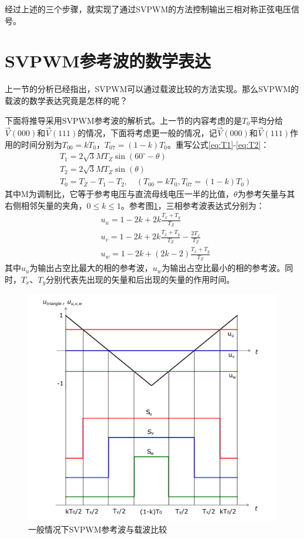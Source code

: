 \documentclass{ctexart}
\numberwithin{equation}{section}
\begin{document}
经过上述的三个步骤，就实现了通过SVPWM的方法控制输出三相对称正弦电压信号。

\section{SVPWM参考波的数学表达}
上一节的分析已经指出，SVPWM可以通过载波比较的方法实现。那么SVPWM的载波的数学表达究竟是怎样的呢？

下面将推导采用SVPWM参考波的解析式。上一节的内容考虑的是$T_0$平均分给$\vec V(000)$和$\vec V(111)$的情况，下面将考虑更一般的情况，记$\vec V(000)$和$\vec V(111)$作用的时间分别为$T_{00}=kT_0$，$T_{07}=(1-k)T_0$。重写公式\ref{eq:T1}-\ref{eq:T2}：
\begin{equation}
  \begin{aligned}
&T_{1}=2\sqrt{3} M T_{Z} \sin \left(60^{\circ}-\theta\right)\\
&T_{2}=2\sqrt{3} M T_{Z} \sin (\theta)\\
&T_0 = T_Z - T_1 -T_2,\quad (T_{00}=kT_0,T_{07}=(1-k)T_0)
\end{aligned}
\end{equation}
其中M为调制比，它等于参考电压与直流母线电压一半的比值，$ \theta $为参考矢量与其右侧相邻矢量的夹角，$ 0\leq k\leq 1 $。参考图\ref{fig:svpwm-wave0}，三相参考波表达式分别为：
\begin{equation}
  \begin{aligned}
  	&u_{u} = 1-2k+2k\frac{T_x+T_y}{T_Z}\\
  	&u_{v} = 1-2k+2k\frac{T_x+T_y}{T_Z}-\frac{2T_x}{T_Z} \\
  	&u_{w} = 1-2k+(2k-2)\frac{T_x+T_y}{T_Z}
  \end{aligned}
\end{equation}
其中$u_{u}$为输出占空比最大的相的参考波，$u_{w}$为输出占空比最小的相的参考波。同时，$ T_x $、$ T_y $分别代表先出现的矢量和后出现的矢量的作用时间。

\begin{figure}[hbt]
  \centering
  \includegraphics[width = .6\linewidth ]{svpwm_modulation_wave2}
  \caption{一般情况下SVPWM参考波与载波比较}
  \label{fig:svpwm-wave0}
\end{figure}
\end{document}
